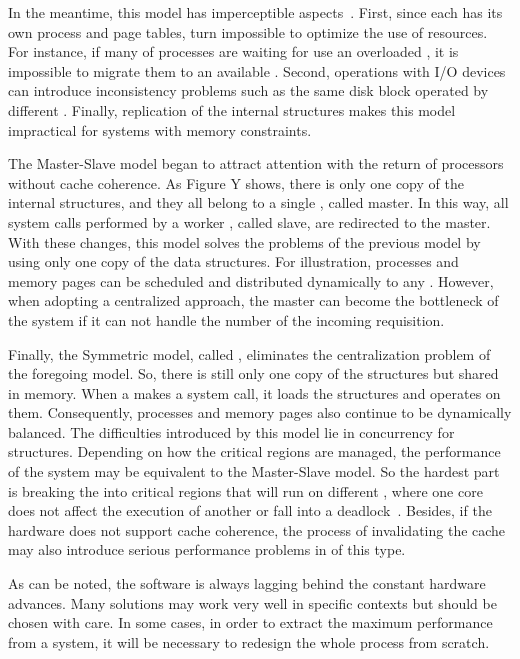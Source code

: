 			In the meantime, this model has imperceptible aspects~\cite{tanenbaum:4ed}.
			First, since each \cpu has its own process and page tables, turn impossible
			to optimize the use of resources.
			For instance, if many of processes are waiting for use an overloaded \cpu,
			it is impossible to migrate them to an available \cpu.
			Second, operations with I/O devices can introduce inconsistency problems
			such as the same disk block operated by different \cpus.
			Finally, replication of the internal \os structures makes this model
			impractical for systems with memory constraints.

			The Master-Slave model began to attract attention with the return of
			processors without cache coherence.
			As Figure Y shows, there is only one copy of the internal \os structures,
			and they all belong to a single \cpu, called master.
			In this way, all system calls performed by a worker \cpu, called slave,
			are redirected to the master.
			With these changes, this model solves the problems of the previous model
			by using only one copy of the data structures.
			For illustration, processes and memory pages can be scheduled and
			distributed dynamically to any \cpus.
			However, when adopting a centralized approach, the master can become
			the bottleneck of the system if it can not handle the number of the
			incoming requisition.

			Finally, the Symmetric model, called \smp, eliminates the centralization
			problem of the foregoing model.
			So, there is still only one copy of the \os structures but shared in memory.
			When a \cpu makes a system call, it loads the structures and operates on them.
			Consequently, processes and memory pages also continue to be dynamically balanced.
			The difficulties introduced by this model lie in concurrency for \os structures.
			Depending on how the critical regions are managed, the performance of the system
			may be equivalent to the Master-Slave model. So the hardest part is breaking the
			\os into critical regions that will run on different \cpus, where one core does
			not affect the execution of another or fall into a deadlock~\cite{tanenbaum:4ed}.
			Besides, if the hardware does not support cache coherence, the process of
			invalidating the cache may also introduce serious performance problems in \oses of this type.

			As can be noted, the software is always lagging behind the constant hardware advances.
			Many solutions may work very well in specific contexts but should be chosen with care.
			In some cases, in order to extract the maximum performance from a system, it will be
			necessary to redesign the whole process from scratch.

